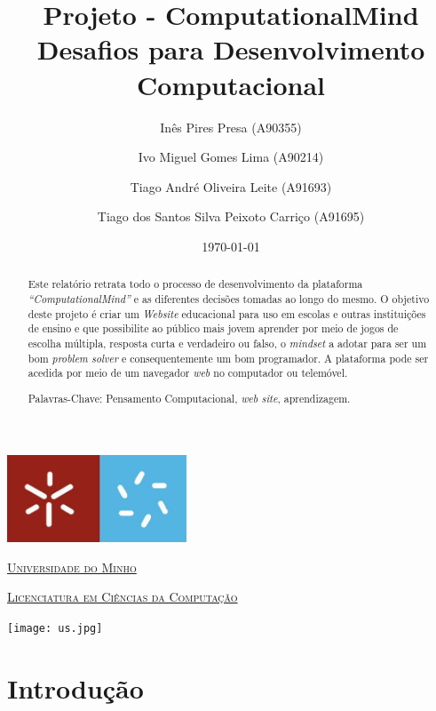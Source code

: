 \documentclass[11pt,a4paper]{report}
\title{Projeto - ComputationalMind\\ Desafios para Desenvolvimento  Computacional} %
\author{Inês Pires Presa (A90355)\and Ivo Miguel Gomes Lima (A90214)\and Tiago André Oliveira Leite (A91693)\and Tiago dos Santos Silva Peixoto Carriço (A91695)} %
\date{\today} %
\begin{document}
\clearpage
\thispagestyle{empty}

  \begin{minipage}{0.9\linewidth}
        \centering
    \includegraphics[width=0.4\textwidth]{um.jpeg}\par\vspace{1cm}
                \href{https://www.uminho.pt/PT}
    {\scshape\LARGE Universidade do Minho} \par
    \vspace{0.6cm}
                \href{https://lcc.di.uminho.pt}
    {\scshape\Large Licenciatura em Ciências da Computação} \par
    \maketitle
    \begin{center}
      \texttt{[image: us.jpg]}
\end{center}
  \end{minipage}

\begin{abstract}  %

Este relatório retrata todo o processo de desenvolvimento da plataforma \emph{“ComputationalMind”} e as diferentes decisões tomadas ao longo do mesmo. O objetivo deste projeto é criar um \emph{Website} educacional para uso em escolas e outras instituições de ensino e que possibilite ao público mais jovem aprender por meio de jogos de escolha múltipla, resposta curta e verdadeiro ou falso, o \emph{mindset} a adotar para ser um bom \emph{problem solver} e consequentemente um bom programador. A plataforma pode ser acedida por meio de um navegador \emph{web} no computador ou telemóvel.

Palavras-Chave: Pensamento Computacional, \emph{web site}, aprendizagem.
\end{abstract}

\tableofcontents %

\chapter{Introdução}
\end{document}

